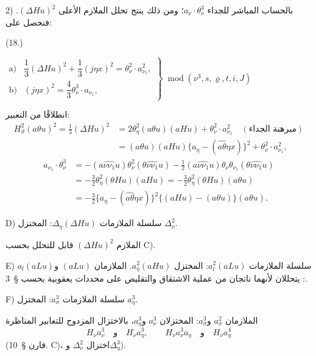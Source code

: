 \documentclass[11pt]{article}
\providecommand{\A}{\Delta}
\providecommand{\R}{\varrho}
\providecommand{\modu}[1]{\;\operatorname{mod} #1}
\begin{document}
2) بالحساب المباشر للجداء $a_\nu\cdot\theta_\nu^3$؛ ومن ذلك ينتج تحلل الملازم الأعلى $(\A Hu)^2$. فنحصل على:
\par\smallskip\noindent
\begin{minipage}[c]{4.8em}
\centering (18.)
\end{minipage}%
\begin{minipage}[c]{\dimexpr\linewidth-4.8em\relax}
\centering
\(\displaystyle
\left.\begin{array}{ll}
\text{a)}&\dfrac13(\A Hu)^2+\dfrac13(j\eta x)^2=\theta_\nu^2\cdot a_{\nu_1}^2,\\[0.6em]
\text{b)}&(j\eta x)^2=\dfrac43\theta_\nu^3\cdot a_{\nu_1},
\end{array}\right\}\modu{(\nu^3,s,\R,t,i,J)}
\)
\end{minipage}
\par\smallskip
انطلاقًا من التعبير:
\[
\begin{aligned}
H_\vartheta^2(a\theta u)^2=\frac13(\A Hu)^2
&=2\theta_\eta^2(a\theta u)(aHu)+\theta_\nu^2\cdot a_{\nu_1}^2\quad(\text{مبرهنة الجداء})\\
&=(a\theta u)(aHu)\{a_\eta-(\widehat{a\theta}\eta x)\}^2+\theta_\nu^2\cdot a_{\nu_1}^2,
\end{aligned}
\]
\[
\begin{aligned}
a_{\nu_1}\cdot\theta_\nu^3
&=-(a\widehat{\nu\nu_1}u)\theta_\nu^2(\theta\widehat{\nu\nu_1}u)-\frac12(a\widehat{\nu\nu_1}u)\theta_\nu\theta_{\nu_1}(\theta\widehat{\nu\nu_1}u)\\
&=-\frac32\theta_\eta^2(\theta Hu)(aHu)=-\frac32\theta_\eta^2(\theta Hu)(a\theta u)\\
&=-\frac32\{a_\eta-(\widehat{a\theta}\eta x)\}^2\{(aHu)-(a\theta u)\}(a\theta u).
\end{aligned}
\]

\noindent D) سلسلة الملازمات $\A_\eta(\A Hu)$: المختزل $\A_\nu^2$.

الملازم $(\A Hu)^2$ قابل للتحلل بحسب C).

\noindent E) سلسلة الملازمات $a_l^2(aLu)$: المختزل $a_\eta^2(aHu)$.
الملازمان $(aLu)$ و$a_l(aLu)$: يتحللان لأنهما ناتجان من عملية الاشتقاق والتقليص على محددات يعقوبية بحسب \S\ 3.

\noindent F) سلسلة الملازمات $a_\sigma^3$: المختزل $a_\eta^3$.

الملازمان $a_\sigma^2$ و$a_\sigma^3$: المختزلان $a_\nu^3$ و$a_\eta^3$، بالاختزال المزدوج للتعابير المناظرة
\[
H_\nu a_\nu^3\quad\text{و}\quad H_\nu a_\eta^3,
\qquad
H_\nu a_\nu^3a_\eta\quad\text{و}\quad H_\nu a_\eta^4
\]
(قارن \S\ 10. C)، اختزال $\A_\nu^2$ و$\A_\eta^3$).
\end{document}
